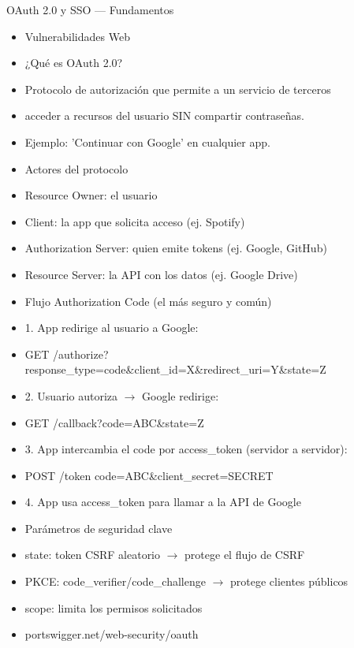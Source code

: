 \documentclass[aspectratio=169,10pt]{beamer}
\begin{document}
\begin{frame}[allowframebreaks]{OAuth 2.0 y SSO --- Fundamentos}
\small
  \begin{itemize}
  \item Vulnerabilidades Web
  \item ¿Qué es OAuth 2.0?
  \item Protocolo de autorización que permite a un servicio de terceros
  \item acceder a recursos del usuario SIN compartir contraseñas.
  \item Ejemplo: 'Continuar con Google' en cualquier app.
  \item Actores del protocolo
  \item Resource Owner: el usuario
  \item Client: la app que solicita acceso (ej. Spotify)
  \item Authorization Server: quien emite tokens (ej. Google, GitHub)
  \item Resource Server: la API con los datos (ej. Google Drive)
  \item Flujo Authorization Code (el más seguro y común)
  \item 1. App redirige al usuario a Google:
  \item GET /authorize?response\_type=code\&client\_id=X\&redirect\_uri=Y\&state=Z
  \item 2. Usuario autoriza $\rightarrow$ Google redirige:
  \item GET /callback?code=ABC\&state=Z
  \item 3. App intercambia el code por access\_token (servidor a servidor):
  \item POST /token code=ABC\&client\_secret=SECRET
  \item 4. App usa access\_token para llamar a la API de Google
  \item Parámetros de seguridad clave
  \item state: token CSRF aleatorio $\rightarrow$ protege el flujo de CSRF
  \item PKCE: code\_verifier/code\_challenge $\rightarrow$ protege clientes públicos
  \item scope: limita los permisos solicitados
  \item portswigger.net/web-security/oauth
  \end{itemize}
\end{frame}
\end{document}
